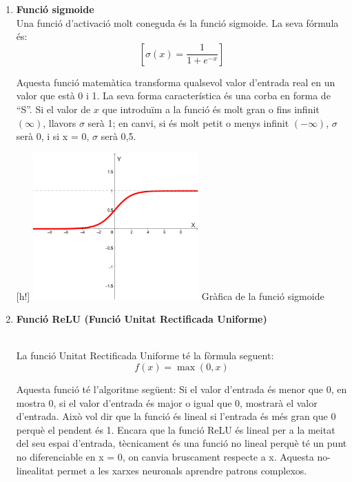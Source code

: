 \begin{enumerate}
    \item \label{sigmoide}{\textbf{Funció sigmoide}}\\
    Una funció d'activació molt coneguda és la funció sigmoide. La seva fórmula és:
    $$[ \sigma(x) = \frac{1}{1 + e^{-x}} ]$$

    Aquesta funció matemàtica transforma qualsevol valor d'entrada real en un valor que està 0 i 1. La seva forma característica és una corba en forma de ``S''. Si el valor de $x$ que introduïm a la funció és molt gran o fins infinit $(\infty)$, llavors $\sigma$ serà 1; en canvi, si és molt petit o menys infinit $(-\infty)$, $\sigma$ serà 0, i si x = 0, $\sigma$ serà 0,5.

    \begin{center}[h!]
        \centering
        \includegraphics[width=0.5\textwidth]{./figures/grafica_sigmoide.png}
        \small{Gràfica de la funció sigmoide}
    \end{center}

    \item \hypertarget{subsec:1}{\textbf{Funció ReLU (Funció Unitat Rectificada Uniforme)}}\\

    La funció Unitat Rectificada Uniforme té la fòrmula seguent:
    \[ f(x) = \max(0, x) \]

    Aquesta funció té l'algoritme següent: Si el valor d'entrada és menor que 0, en mostra 0, si el valor d'entrada és major o igual que 0, mostrarà el valor d'entrada. Això vol dir que la funció és lineal si l'entrada és més gran que 0 perquè el pendent és 1. Encara que la funció ReLU és lineal per a la meitat del seu espai d'entrada, tècnicament és una funció no lineal perquè té un punt no diferenciable en x = 0, on canvia bruscament respecte a x. Aquesta no-linealitat permet a les xarxes neuronals aprendre patrons complexos.


\end{enumerate}
